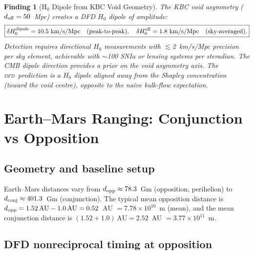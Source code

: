 \documentclass[aps,prd,twocolumn,superscriptaddress,nofootinbib,longbibliography]{revtex4-2}
\newcommand{\DFD}{\textsc{dfd}}
\newtheorem{finding}{Finding}
\begin{document}
\begin{finding}[H$_0$ Dipole from KBC Void Geometry]
\label{finding:H0-dipole}
The KBC void asymmetry ($d_{\rm off} = 50$~Mpc) creates a DFD $H_0$ dipole
of amplitude:
\begin{equation}
\boxed{
\delta H_0^{\rm dipole} = 10.5\ \si{km/s/Mpc}\quad(\text{peak-to-peak}),
\quad\delta H_0^{\rm eff} = 1.8\ \si{km/s/Mpc}\quad(\text{sky-averaged}).
}
\end{equation}
Detection requires directional $H_0$ measurements with $\lesssim$2~km/s/Mpc
precision per sky element, achievable with $\sim$100 SNIa or lensing systems
per steradian.  The CMB dipole direction provides a prior on the void
asymmetry axis.  The \DFD\ prediction is a $H_0$ dipole aligned \emph{away}
from the Shapley concentration (toward the void centre), opposite to the
naive bulk-flow expectation.
\end{finding}

\section{Earth--Mars Ranging: Conjunction vs Opposition}
\label{sec:mars-ranging}

\subsection{Geometry and baseline setup}

Earth--Mars distances vary from $d_{\rm opp} \approx 78.3$~Gm (opposition,
perihelion) to $d_{\rm conj} \approx 401.3$~Gm (conjunction).  The typical
mean opposition distance is $d_{\rm opp} = 1.52\,\text{AU} - 1.0\,\text{AU}
= 0.52$~AU $= 7.78\times10^{10}$~m (mean), and the mean conjunction distance
is $(1.52 + 1.0)\,\text{AU} = 2.52$~AU $= 3.77\times10^{11}$~m.

\subsection{DFD nonreciprocal timing at opposition}
\end{document}
